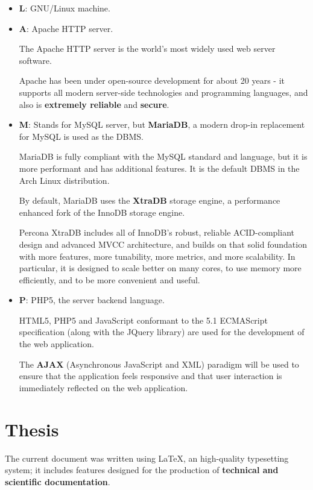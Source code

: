 \documentclass[12pt]{report}
\newcommand{\+}{\discretionary{\mbox{\scriptsize$\hookleftarrow$}}{}{}}
\renewcommand\emph{\textbf}
\begin{document}
                \begin{itemize}
                    \item \emph{L}: GNU/Linux machine.
                    \item \emph{A}: Apache HTTP server.

                     The Apache HTTP server is the world's most widely used web server software.

                     Apache has been under open-source development for about 20 years - it supports all modern server-side technologies and programming languages, and also is \emph{extremely reliable} and \emph{secure}.

                    \item \emph{M}: Stands for MySQL server, but \emph{MariaDB}, a modern drop-in replacement for MySQL is used as the DBMS. 

                    MariaDB is fully compliant with the MySQL standard and language, but it is more performant and has additional features. It is the default DBMS in the Arch Linux distribution.

                    By default, MariaDB uses the \emph{XtraDB} storage engine, a performance enhanced fork of the InnoDB storage engine.

                    Percona XtraDB includes all of InnoDB's robust, reliable ACID-compliant design and advanced MVCC architecture, and builds on that solid foundation with more features, more tunability, more metrics, and more scalability. In particular, it is designed to scale better on many cores, to use memory more efficiently, and to be more convenient and useful. 

                    \item \emph{P}: PHP5, the server backend language. 

                    HTML5, PHP5 and JavaScript conformant to the 5.1 ECMAScript specification (along with the JQuery library) are used for the development of the web application. 

                    The \emph{AJAX} (Asynchronous JavaScript and XML) paradigm will be used to ensure that the application feels responsive and that user interaction is immediately reflected on the web application.

                \end{itemize}
               
            \section{Thesis}
                The current document was written using \LaTeX{}, an high-quality typesetting system; it includes features designed for the production of \emph{technical and scientific documentation}.
\end{document}
